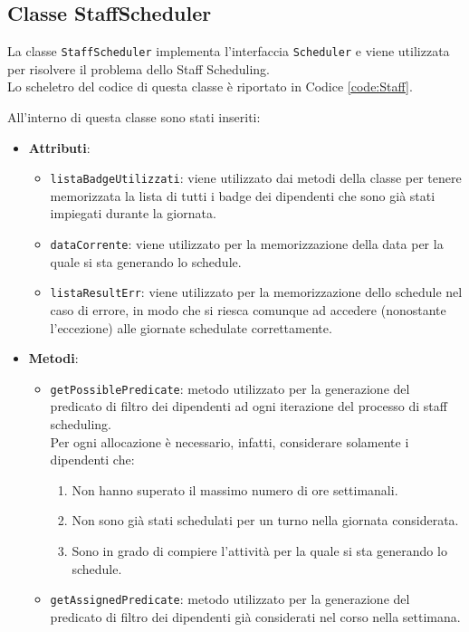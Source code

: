 \subsection{Classe StaffScheduler}
La classe \verb|StaffScheduler| implementa l'interfaccia \verb|Scheduler| e viene utilizzata per risolvere il problema dello Staff Scheduling.\\
Lo scheletro del codice di questa classe è riportato in Codice \ref{code:Staff}.
\lstset{
    caption=Classe StaffScheduler,
    label=code:Staff }

All'interno di questa classe sono stati inseriti:
\begin{itemize}
	\item \textbf{Attributi}:
		\begin{itemize}
			\item \verb|listaBadgeUtilizzati|: viene utilizzato dai metodi della classe per tenere memorizzata la lista di tutti i badge dei dipendenti che sono già stati impiegati durante la giornata.
			\item \verb|dataCorrente|: viene utilizzato per la memorizzazione della data per la quale si sta generando lo schedule.
			\item \verb|listaResultErr|: viene utilizzato per la memorizzazione dello schedule nel caso di errore, in modo che si riesca comunque ad accedere (nonostante l'eccezione) alle giornate schedulate correttamente.
		\end{itemize}
	\item \textbf{Metodi}:
		\begin{itemize}
			\item \verb|getPossiblePredicate|: metodo utilizzato per la generazione del predicato di filtro dei dipendenti ad ogni iterazione del processo di staff scheduling.\\
				Per ogni allocazione è necessario, infatti, considerare solamente i dipendenti che:
				\begin{enumerate}
					\item Non hanno superato il massimo numero di ore settimanali.
					\item Non sono già stati schedulati per un turno nella giornata considerata.
					\item Sono in grado di compiere l'attività per la quale si sta generando lo schedule.
				\end{enumerate}
			\item \verb|getAssignedPredicate|: metodo utilizzato per la generazione del predicato di filtro dei dipendenti già considerati nel corso nella settimana.\\

\end{itemize}
\end{itemize}
